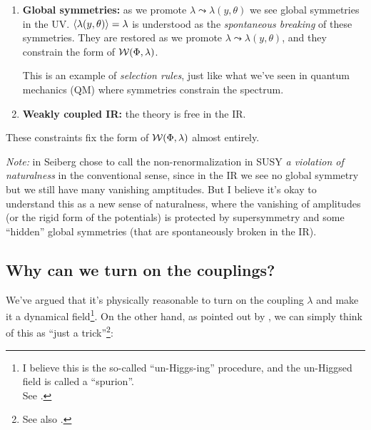 \documentclass[a4paper
	,10pt
]{article}
\begin{document}
{\begin{enumerate}
\begin{enumerate}
		
		\item \textbf{Global symmetries:} as we promote $\lambda\leadsto\lambda(y,\theta)$ we see global symmetries in the UV. $\langle\lambda(y,\theta)\rangle = \lambda$ is understood as the \textit{spontaneous breaking} of these symmetries. They are restored as we promote $\lambda\leadsto\lambda(y,\theta)$, and they constrain the form of $\mathcal{W}(\Phi,\lambda)$. 
		
		This is an example of \textit{selection rules}, just like what we've seen in quantum mechanics (QM) where symmetries constrain the spectrum. 
		
		\item \textbf{Weakly coupled IR:} the theory is free in the IR.
		\end{enumerate}
	These constraints fix the form of $\mathcal{W}(\Phi,\lambda)$ almost entirely. 
	\end{enumerate}
}
	
	\textit{Note:} in \cite{Seiberg:1993vc} Seiberg chose to call the non-renormalization in SUSY \textit{a violation of naturalness} in the conventional sense, since in the IR we see no global symmetry but we still have many vanishing amptitudes. But I believe it's okay to understand this as a new sense of naturalness, where the vanishing of amplitudes (or the rigid form of the potentials) is protected by supersymmetry and some ``hidden'' global symmetries (that are spontaneously broken in the IR). 
	
\subsection{Why can we turn on the couplings?}
	We've argued that it's physically reasonable to turn on the coupling $\lambda$ and make it a dynamical field\footnote{
		I believe this is the so-called ``un-Higgs-ing'' procedure, and the un-Higgsed field is called a ``spurion''. \\
		\hspace*{2em}
		See .
	}. On the other hand, as pointed out by \textcite{Argyres:1996abc}, we can simply think of this as ``just a trick''\footnote{
		See also . 
	}:
	
\end{document}
